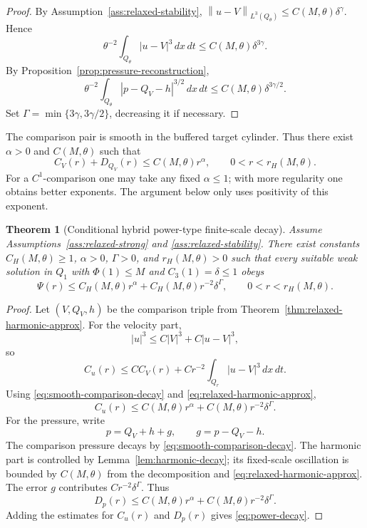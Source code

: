 \documentclass[pdflatex,sn-mathphys-num]{sn-jnl}
\numberwithin{equation}{section}
\theoremstyle{thmstyleone}
\newtheorem{theorem}{Theorem}[section]
\theoremstyle{thmstylethree}
\newcommand{\dxdt}{\,dx\,dt}
\newcommand{\norm}[2]{\left\|#1\right\|_{#2}}
\begin{document}
\begin{proof}
By Assumption~\ref{ass:relaxed-stability}, \(\norm{u-V}{L^3(Q_\theta)}\le C(M,\theta)\delta^\gamma\).  Hence
\[
        \theta^{-2}\int_{Q_\theta}|u-V|^3\dxdt
        \le C(M,\theta)\delta^{3\gamma}.
\]
By Proposition~\ref{prop:pressure-reconstruction},
\[
        \theta^{-2}\int_{Q_\theta}|p-Q_V-h|^{3/2}\dxdt
        \le C(M,\theta)\delta^{3\gamma/2}.
\]
Set \(\Gamma=\min\{3\gamma,3\gamma/2\}\), decreasing it if necessary.
\end{proof}

The comparison pair is smooth in the buffered target cylinder.  Thus there exist \(\alpha>0\) and \(C(M,\theta)\) such that
\begin{equation}
        C_V(r)+D_{Q_V}(r)
        \le C(M,\theta)r^\alpha,
        \qquad 0<r<r_H(M,\theta).
        \label{eq:smooth-comparison-decay}
\end{equation}
For a \(C^1\)-comparison one may take any fixed \(\alpha\le1\); with more regularity one obtains better exponents.  The argument below only uses positivity of this exponent.

\begin{theorem}[Conditional hybrid power-type finite-scale decay]
\label{thm:power-decay-proof}
Assume Assumptions~\ref{ass:relaxed-strong} and \ref{ass:relaxed-stability}.  There exist constants \(C_H(M,\theta)\ge1\), \(\alpha>0\), \(\Gamma>0\), and \(r_H(M,\theta)>0\) such that every suitable weak solution in \(Q_1\) with \(\Phi(1)\le M\) and \(C_3(1)=\delta\le1\) obeys
\begin{equation}
        \Psi(r)
        \le C_H(M,\theta)r^\alpha+C_H(M,\theta)r^{-2}\delta^\Gamma,
        \qquad 0<r<r_H(M,\theta).
        \label{eq:power-decay}
\end{equation}
\end{theorem}

\begin{proof}
Let \((V,Q_V,h)\) be the comparison triple from Theorem~\ref{thm:relaxed-harmonic-approx}.  For the velocity part,
\[
        |u|^3\le C|V|^3+C|u-V|^3,
\]
so
\[
        C_u(r)
        \le C C_V(r)+Cr^{-2}\int_{Q_r}|u-V|^3\dxdt.
\]
Using \eqref{eq:smooth-comparison-decay} and \eqref{eq:relaxed-harmonic-approx},
\[
        C_u(r)
        \le C(M,\theta)r^\alpha+C(M,\theta)r^{-2}\delta^\Gamma.
\]
For the pressure, write
\[
        p=Q_V+h+g,
        \qquad
        g=p-Q_V-h.
\]
The comparison pressure decays by \eqref{eq:smooth-comparison-decay}.  The harmonic part is controlled by Lemma~\ref{lem:harmonic-decay}; its fixed-scale oscillation is bounded by \(C(M,\theta)\) from the decomposition and \eqref{eq:relaxed-harmonic-approx}.  The error \(g\) contributes \(Cr^{-2}\delta^\Gamma\).  Thus
\[
        D_p(r)
        \le C(M,\theta)r^\alpha+C(M,\theta)r^{-2}\delta^\Gamma.
\]
Adding the estimates for \(C_u(r)\) and \(D_p(r)\) gives \eqref{eq:power-decay}.
\end{proof}
\end{document}
